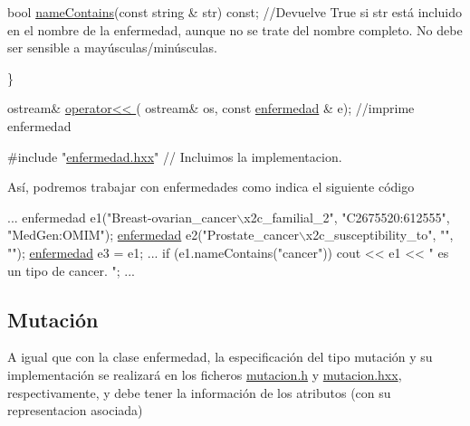 \begin{DoxyCode}
 \textcolor{keywordtype}{bool} \hyperlink{classenfermedad_a31f2b1bed5745d9f00f3e567c04e68af}{nameContains}(\textcolor{keyword}{const} \textcolor{keywordtype}{string} & str) \textcolor{keyword}{const};   \textcolor{comment}{//Devuelve True si str está incluido en el
       nombre de la enfermedad, aunque no se trate del nombre completo. No debe ser sensible a mayúsculas/minúsculas. }

\}

 ostream& \hyperlink{enfermedad_8h_a6cabaa51c1fab8960486e2c2e51071f0}{operator<< }( ostream& os, \textcolor{keyword}{const} \hyperlink{classenfermedad}{enfermedad} & e); \textcolor{comment}{//imprime enfermedad }

\textcolor{preprocessor}{#include "\hyperlink{enfermedad_8hxx}{enfermedad.hxx}"} \textcolor{comment}{// Incluimos la implementacion.}
\end{DoxyCode}


Así, podremos trabajar con enfermedades como indica el siguiente código 
\begin{DoxyCode}
...
enfermedad e1(\textcolor{stringliteral}{"Breast-ovarian\_cancer\(\backslash\)x2c\_familial\_2"}, \textcolor{stringliteral}{"C2675520:612555"}, \textcolor{stringliteral}{"MedGen:OMIM"});
\hyperlink{classenfermedad}{enfermedad} e2(\textcolor{stringliteral}{"Prostate\_cancer\(\backslash\)x2c\_susceptibility\_to"}, \textcolor{stringliteral}{""}, \textcolor{stringliteral}{""});
\hyperlink{classenfermedad}{enfermedad} e3 = e1; 
...
if (e1.nameContains(\textcolor{stringliteral}{"cancer"})) 
  cout << e1 << \textcolor{stringliteral}{" es un tipo de cancer. "}; 
...
\end{DoxyCode}
\hypertarget{index_mutation}{}\subsection{Mutación}\label{index_mutation}
A igual que con la clase enfermedad, la especificación del tipo mutación y su implementación se realizará en los ficheros \hyperlink{mutacion_8h}{mutacion.\+h} y \hyperlink{mutacion_8hxx}{mutacion.\+hxx}, respectivamente, y debe tener la información de los atributos (con su representacion asociada)

